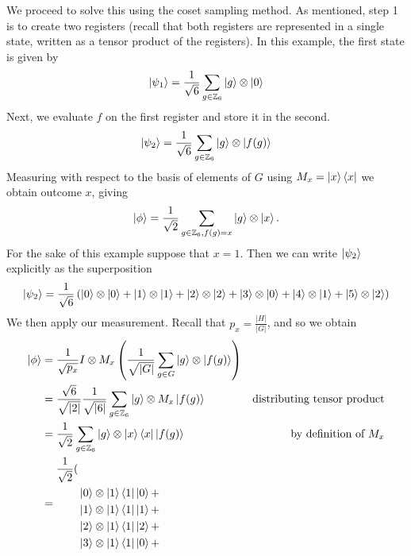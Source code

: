 \documentclass{beamer}
\renewcommand{\bra}{\Bra}
\renewcommand{\ket}{\Ket}
\renewcommand{\bra}{\Bra}
\renewcommand{\ket}{\Ket}
\newcommand{\abs}[1]{\left\lvert #1 \right\rvert}
\newcommand{\bb}[1]{\mathbb{#1}}
\begin{document}
\begin{frame}
\begin{example}
            We proceed to solve this using the coset sampling method.
            As mentioned, step 1 is to create two registers (recall that both registers are represented in a single state, written as a tensor product of the registers).
            In this example, the first state is given by 
                $$\ket{\psi_1} = \frac{1}{\sqrt{6}} \sum_{g \in \bb{Z}_6} \ket{g} \otimes \ket{0}$$
            Next, we evaluate $f$ on the first register and store it in the second.
                $$\ket{\psi_2} = \frac{1}{\sqrt{6}} \sum_{g \in \bb{Z}_6} \ket{g} \otimes \ket{f(g)}$$
            Measuring with respect to the basis of elements of $G$ using $M_x = \ket{x} \bra{x}$ we obtain outcome $x$, giving  
                $$ \ket{\phi} = \frac{1}{\sqrt{2}} \sum_{g \in \bb{Z}_6, f(g) = x} \ket{g} \otimes \ket{x}.$$
            For the sake of this example suppose that $x = 1$.
            Then we can write $\ket{\psi_2}$ explicitly as the superposition
                \begin{align*}
                \ket{\psi_2} &= \frac{1}{\sqrt{6}} \left( \ket{0} \otimes \ket{0} + \ket{1} \otimes \ket{1} + \ket{2} \otimes \ket{2} + \ket{3} \otimes \ket{0} + \ket{4} \otimes \ket {1} + \ket{5} \otimes \ket {2}\right)\\
                \end{align*}
            We then apply our measurement.
            Recall that $p_x = \frac{\abs{H}}{\abs{G}}$, and so we obtain
                \begin{align*}
                \ket{\phi} &= \frac{1}{\sqrt{p_x}} I \otimes M_x \left(\frac{1}{\sqrt{\abs{G}}} \sum_{g \in G} \ket{g} \otimes \ket{f(g)}\right)\\
                &= \frac{\sqrt{6}}{\sqrt{\abs{2}}} \frac{1}{\sqrt{\abs{6}}} \sum_{g \in \bb{Z}_6} \ket{g} \otimes M_x \ket{f(g)} & \text{distributing tensor product}\\
                &= \frac{1}{\sqrt{2}} \sum_{g \in \bb{Z}_6} \ket{g} \otimes \ket{x} \bra{x} \ket{f(g)} & \text{by definition of $M_x$}\\
                &= \begin{aligned}
                    \frac{1}{\sqrt{2}} (&\\
                    &\ket{0} \otimes \ket{1}\bra{1}\ket{0} + \\
                    &\ket{1} \otimes \ket{1}\bra{1}\ket{1} + \\
                    &\ket{2} \otimes \ket{1}\bra{1}\ket{2} + \\
                    &\ket{3} \otimes \ket{1}\bra{1}\ket{0} + \\

\end{aligned}
\end{align*}
\end{example}
\end{frame}
\end{document}
